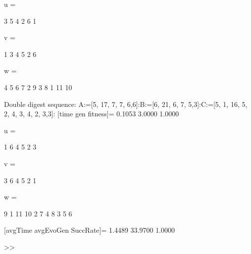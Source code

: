u =

     3     5     4     2     6     1


v =

     1     3     4     5     2     6


w =

     4     5     6     7     2     9     3     8     1    11    10

Double digest sequence:
A:=[5, 17, 7, 7, 6,6]:B:=[6, 21, 6, 7, 5,3]:C:=[5, 1, 16, 5, 2, 4, 3, 4, 2, 3,3]:
[time gen fitness]=
    0.1053    3.0000    1.0000


u =

     1     6     4     5     2     3


v =

     3     6     4     5     2     1


w =

     9     1    11    10     2     7     4     8     3     5     6

[avgTime  avgEvoGen  SuccRate]=
    1.4489   33.9700    1.0000

>> 
